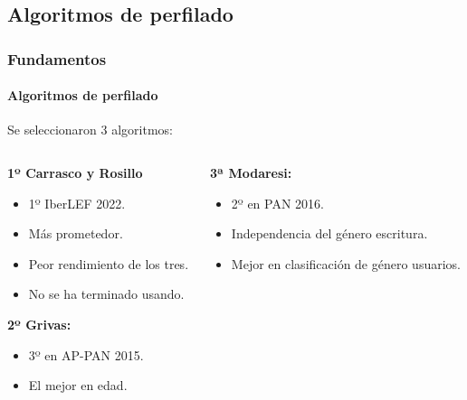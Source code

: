 \documentclass{beamer}
\begin{document}
		\subsection{Algoritmos de perfilado}
		\begin{frame}
			\frametitle{Fundamentos}
			\framesubtitle{Algoritmos de perfilado}
			Se seleccionaron 3 algoritmos:
			\begin{columns}[T]
				\hspace{-3cm}
				\begin{column}{0.8\textwidth}
					\begin{description}[labelwidth=0.01mm]
						\item \textbf{1º Carrasco y Rosillo} 
								\begin{itemize}
									\item 1º IberLEF 2022.\pause
									\item Más prometedor.\pause
									\item Peor rendimiento de los tres.\pause
									\item No se ha terminado usando.\pause

								\end{itemize}
						\vspace{0.8cm} \pause
						\item \textbf{2º Grivas:} 
							\begin{itemize}
								\item 3º en AP-PAN 2015.\pause
								\item El mejor en edad.\pause
							\end{itemize}
					\end{description}
				\end{column}
				\hspace{-3.5cm}
				\begin{column}{0.8\textwidth}
					\begin{description}[labelwidth=0.01mm] \pause
						\item \textbf{3ª Modaresi:} 
						\begin{itemize}
							\item 2º en PAN 2016.\pause
							\item Independencia del género escritura.\pause
							\item Mejor en clasificación de género usuarios.\pause
						\end{itemize}
					\end{description}
				\end{column}
			\end{columns}
		\end{frame}
\end{document}
